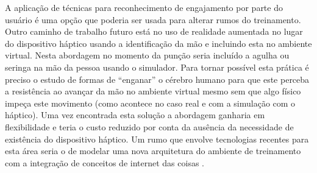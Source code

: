 A aplicação de técnicas para reconhecimento de engajamento por parte do usuário \cite{Mitsis2022} é uma opção que poderia ser usada para alterar rumos do treinamento.
Outro caminho de trabalho futuro está no uso de realidade aumentada no lugar do dispositivo háptico usando a identificação da mão e incluindo esta no ambiente virtual. Nesta abordagem no momento da punção seria incluído a agulha ou seringa na mão da pessoa usando o simulador. Para tornar possível esta prática é preciso o estudo de formas de ``enganar'' o cérebro humano para que este perceba a resistência ao avançar da mão no ambiente virtual mesmo sem que algo físico impeça este movimento (como acontece no caso real e com a simulação com o háptico). Uma vez encontrada esta solução a abordagem ganharia em flexibilidade e teria o custo reduzido por conta da ausência da necessidade de existência do dispositivo háptico. Um rumo que envolve tecnologias recentes para esta área seria o de modelar uma nova arquitetura do ambiente de treinamento com a integração de conceitos de internet das coisas \cite{Ahmad2022}.